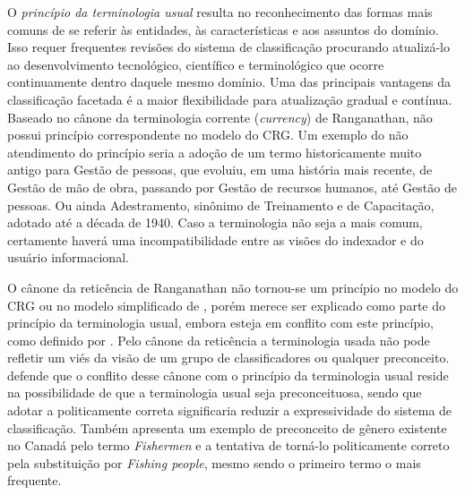 O \emph{princípio da terminologia usual} resulta no reconhecimento das formas mais comuns de se referir às entidades, às características e aos assuntos do domínio. Isso requer frequentes revisões do sistema de classificação procurando atualizá-lo ao desenvolvimento tecnológico, científico e terminológico que ocorre continuamente dentro daquele mesmo domínio. Uma das principais vantagens da classificação facetada é a maior flexibilidade para atualização gradual e contínua. Baseado no cânone da terminologia corrente (\textit{currency}) de Ranganathan, não possui princípio correspondente no modelo do CRG. Um exemplo do não atendimento do princípio seria a adoção de um termo historicamente muito antigo para Gestão de pessoas, que evoluiu, em uma história mais recente, de Gestão de mão de obra, passando por Gestão de recursos humanos, até Gestão de pessoas. Ou ainda Adestramento, sinônimo de Treinamento e de Capacitação, adotado até a década de 1940. Caso a terminologia não seja a mais comum, certamente haverá uma incompatibilidade entre as visões do indexador e do usuário informacional.

O cânone da reticência de Ranganathan não tornou-se um princípio no modelo do CRG ou no modelo simplificado de , porém merece ser explicado como parte do princípio da terminologia usual, embora esteja em conflito com este princípio, como definido por . Pelo cânone da reticência a terminologia usada não pode refletir um viés da visão de um grupo de classificadores ou qualquer preconceito.  defende que o conflito desse cânone com o princípio da terminologia usual reside na possibilidade de que a terminologia usual seja preconceituosa, sendo que adotar a politicamente correta significaria reduzir a expressividade do sistema de classificação. Também apresenta um exemplo de preconceito de gênero existente no Canadá pelo termo \textit{Fishermen} e a tentativa de torná-lo politicamente correto pela substituição por \textit{Fishing people}, mesmo sendo o primeiro termo o mais frequente.

